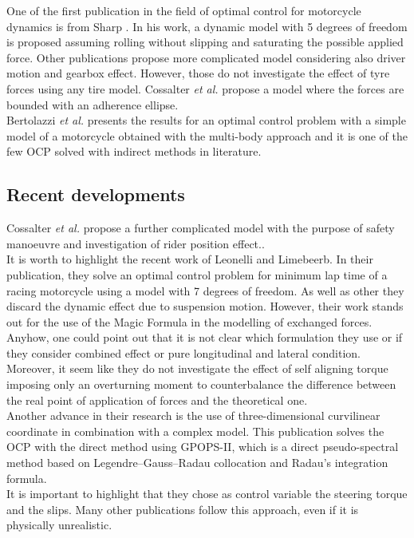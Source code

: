 One of the first publication in the field of optimal control for motorcycle dynamics is from Sharp \cite{sharp2014method}. In his work, a dynamic model with 5 degrees of freedom is proposed assuming rolling without slipping and saturating the possible applied force. Other publications propose more complicated model considering also driver motion and gearbox effect\cite{cossalter2010investigation,lot2008advanced,simon2008application}. However, those do not investigate the effect of tyre forces using any tire model. Cossalter \textit{et al.}\cite{cossalter2010investigation} propose a model where the forces are bounded with an adherence ellipse.\\
Bertolazzi \textit{et al.}\cite{bertolazzi2005symbolic} presents the results for an optimal control problem with a simple model of a motorcycle obtained with the multi-body approach and it is one of the few OCP solved with indirect methods in literature.\cite{biral2016notes}\\
%
\subsection{Recent developments}
%
Cossalter \textit{et al.} propose a further complicated model with the purpose of safety manoeuvre and investigation of rider position effect.\cite{cossalter2013optimization,massaro2010virtual}.\\
It is worth to highlight the recent work of Leonelli and Limebeerb\cite{leonelli2019optimal}. In their publication, they solve an optimal control problem for minimum lap time of a racing motorcycle using a model with 7 degrees of freedom. As well as other they discard the dynamic effect due to suspension motion. However, their work stands out for the use of the Magic Formula \cite{pacejka2012tire} in the modelling of exchanged forces. Anyhow, one could point out that it is not clear which formulation they use or if they consider combined effect or pure longitudinal and lateral condition. Moreover, it seem like they do not investigate the effect of self aligning torque imposing only an overturning moment to counterbalance the difference between the real point of application of forces and the theoretical one.\\
Another advance in their research is the use of three-dimensional curvilinear coordinate in combination with a complex model. This publication solves the OCP with the direct method using GPOPS-II\cite{patterson2014gpops}, which is a direct pseudo-spectral method based on Legendre–Gauss–Radau collocation and Radau’s integration formula.\\
It is important to highlight that they chose as control variable the steering torque and the slips. Many other publications follow this approach, even if it is physically unrealistic. 
%
